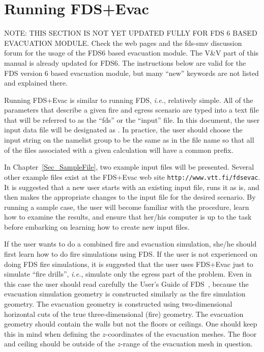 \documentclass[12pt,a4paper,final,twoside]{stylevk}
\begin{document}
\clearpage

\newpage


\chapter{Running FDS+Evac}\label{Sec_Running}

\noindent NOTE: THIS SECTION IS NOT YET UPDATED FULLY FOR FDS 6 BASED
EVACUATION MODULE. Check the web pages and the fds-smv discussion
forum for the usage of the FDS6 based evacuation module. The V\&V part
of this manual is already updated for FDS6.  The instructions below
are valid for the FDS version 6 based evacuation module, but many
``new'' keywords are not listed and explained there.

\noindent Running FDS+Evac is similar to running FDS, \emph{i.e.},
relatively simple.  All of the parameters that describe a given fire
and egress scenario are typed into a text file that will be referred
to as the ``fds'' or the ``input'' file.  In this document, the user
input data file will be designated as .  In practice,
the user should choose the input string  on the
 namelist group to be the same as in the file name so that
all of the files associated with a given calculation will have a
common prefix.


In Chapter~\ref{Sec_SampleFile}, two example input files will be
presented.  Several other example files exist at the FDS+Evac web site
\verb+http://www.vtt.fi/fdsevac+.  It is suggested that a new user
starts with an existing input file, runs it as is, and then makes the
appropriate changes to the input file for the desired scenario.  By
running a sample case, the user will become familiar with the
procedure, learn how to examine the results, and ensure that her/his
computer is up to the task before embarking on learning how to create
new input files.


If the user wants to do a combined fire and evacuation simulation,
she/he should first learn how to do fire simulations using FDS.  If
the user is not experienced on doing FDS fire simulations, it is
suggested that the user uses FDS+Evac just to simulate ``fire
drills'', \emph{i.e.}, simulate only the egress part of the problem.
Even in this case the user should read carefully the User's Guide of
FDS~\cite{FDS_UserGuide}, because the evacuation simulation geometry
is constructed similarly as the fire simulation geometry.  The
evacuation geometry is constructed using two-dimensional horizontal
cuts of the true three-dimensional (fire) geometry.  The evacuation
geometry should contain the walls but not the floors or ceilings.  One
should keep this in mind when defining the $z$-coordinates of the
evacuation meshes.  The floor and ceiling should be outside of the
$z$-range of the evacuation mesh in question.
\end{document}
